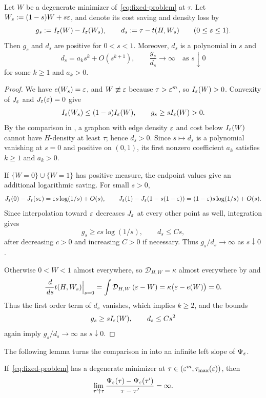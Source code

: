 \begin{lemma}\label{lem:degenerate-smoothing}
Let $W$ be a degenerate minimizer of~\eqref{eq:fixed-problem} at $\tau$.
Let $W_s:=(1-s)W+s\varepsilon$, and
denote its cost saving and density loss by
\[
  g_s:=I_\varepsilon(W)-I_\varepsilon(W_s),
  \qquad
  d_s:=\tau-t(H,W_s)
  \qquad(0\le s\le1).
\]
Then $g_s$ and $d_s$ are positive for $0<s<1$.
Moreover, $d_s$ is a polynomial in $s$ and
\[
  d_s=a_k s^k+O(s^{k+1}),\qquad
  \frac{g_s}{d_s}\longrightarrow\infty
  \quad\text{as }s\downarrow0
\]
for some $k\ge1$ and $a_k>0$.
\end{lemma}

\begin{proof}
We have $e(W_s)=\varepsilon$, and $W\not\equiv\varepsilon$ because $\tau>\varepsilon^m$, so
$I_\varepsilon(W)>0$.  Convexity of $J_\varepsilon$ and $J_\varepsilon(\varepsilon)=0$ give
\[
  I_\varepsilon(W_s)\le(1-s)I_\varepsilon(W),
  \qquad g_s\ge s I_\varepsilon(W)>0.
\]
By the comparison in , a graphon with edge
density $\varepsilon$ and cost below $I_\varepsilon(W)$ cannot have $H$-density at least
$\tau$; hence $d_s>0$.  Since $s\mapsto d_s$ is a polynomial
vanishing at $s=0$ and positive on $(0,1)$, its first nonzero
coefficient $a_k$ satisfies $k\ge1$ and $a_k>0$.

If $\{W=0\}\cup\{W=1\}$ has positive measure, the endpoint values give an
additional logarithmic saving.  For small $s>0$,
\[
  J_\varepsilon(0)-J_\varepsilon(s\varepsilon) =\varepsilon s\log(1/s)+O(s),\qquad J_\varepsilon(1)-J_\varepsilon(1-s(1-\varepsilon)) =(1-\varepsilon)s\log(1/s)+O(s).
\]
Since interpolation toward $\varepsilon$ decreases $J_\varepsilon$ at every other
point as well, integration gives
\[
  g_s\ge c s\log(1/s),\qquad d_s\le C s,
\]
after decreasing $c>0$ and increasing $C>0$ if necessary.
Thus $g_s/d_s\to\infty$ as $s\downarrow0$.

Otherwise $0<W<1$ almost everywhere, so $\mathcal D_{H,W}=\kappa$ almost everywhere by
 and
\[
  \frac{\,d}{\,d s}t(H,W_s)\Big|_{s=0}
  =\int\mathcal D_{H,W}\,(\varepsilon-W)=\kappa\bigl(\varepsilon-e(W)\bigr)=0.
\]
Thus the first order term of $d_s$ vanishes, which implies $k\ge2$,
and the bounds
\[
  g_s\ge s I_\varepsilon(W), \qquad
  d_s\le C s^2
\]
again imply $g_s/d_s\to\infty$ as $s\downarrow0$.
\end{proof}

The following lemma turns the comparison in 
into an infinite left slope of $\Psi_\varepsilon$.

\begin{lemma}\label{lem:degenerate-slope}
If~\eqref{eq:fixed-problem} has a degenerate minimizer at
$\tau\in(\varepsilon^m,\tau_{\max}(\varepsilon))$, then
\[
  \lim_{\tau'\uparrow\tau}\frac{\Psi_\varepsilon(\tau)-\Psi_\varepsilon(\tau')}{\tau-\tau'}=\infty.
\]
\end{lemma}

